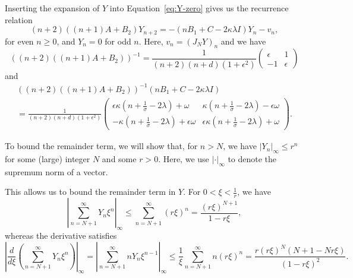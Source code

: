 \documentclass[11pt]{article}
\begin{document}
Inserting the expansion of \(Y\) into Equation~\eqref{eq:Y-zero} gives
us the recurrence relation
\begin{equation*}
  (n + 2)((n + 1)A + B_{2})Y_{n + 2} = -(nB_{1} + C - 2\kappa\lambda I)Y_{n} - v_{n},
\end{equation*}
for even \(n \geq 0\), and \(Y_{n} = 0\) for odd \(n\). Here,
\(v_{n} = (J_{N}Y)_{n}\) and we have
\begin{equation}
  \label{eq:Y-zero-recurrence-1}
  ((n + 2)((n + 1)A + B_{2}))^{-1}
  = \frac{1}{(n + 2)(n + d)(1 + \epsilon^{2})}
  \begin{pmatrix}
    \epsilon & 1 \\ -1 & \epsilon
  \end{pmatrix}
\end{equation}
and
\begin{multline}
  \label{eq:Y-zero-recurrence-2}
  ((n + 2)((n + 1)A + B_{2}))^{-1}(nB_{1} + C - 2\kappa\lambda I)\\
  = \frac{1}{(n + 2)(n + d)(1 + \epsilon^{2})}
  \begin{pmatrix}
    \epsilon\kappa\left(n + \frac{1}{\sigma} - 2\lambda\right) + \omega
    & \kappa\left(n + \frac{1}{\sigma} - 2\lambda\right) - \epsilon \omega\\
    -\kappa\left(n + \frac{1}{\sigma} - 2\lambda\right) + \epsilon \omega
    & \epsilon\kappa\left(n + \frac{1}{\sigma} - 2\lambda\right) + \omega
  \end{pmatrix}.
\end{multline}

To bound the remainder term, we will show that, for \(n > N\), we have
\(|Y_{n}|_{\infty} \leq r^{n}\) for some (large) integer \(N\) and
some \(r > 0\). Here, we use \(|\cdot|_{\infty}\) to denote the
supremum norm of a vector.

This allows us to bound the remainder term in \(Y\). For
\(0 < \xi < \frac{1}{r}\), we have
\begin{equation*}
  \left|\sum_{n = N + 1}^{\infty} Y_{n}\xi^{n}\right|_{\infty}
  \leq \sum_{n = N + 1}^{\infty}(r\xi)^{n}
  = \frac{(r\xi)^{N + 1}}{1 - r\xi},
\end{equation*}
whereas the derivative satisfies
\begin{equation*}
  \left|\frac{d}{d\xi}\left(\sum_{n = N + 1}^{\infty} Y_{n}\xi^{n}\right)\right|_{\infty}
  = \left|\sum_{n = N + 1}^{\infty} nY_{n}\xi^{n - 1}\right|_{\infty}
  \leq \frac{1}{\xi}\sum_{n = N + 1}^{\infty}n(r\xi)^{n}
  = \frac{r(r\xi)^{N}(N + 1 - Nr\xi)}{(1 - r\xi)^{2}}.
\end{equation*}
\end{document}
